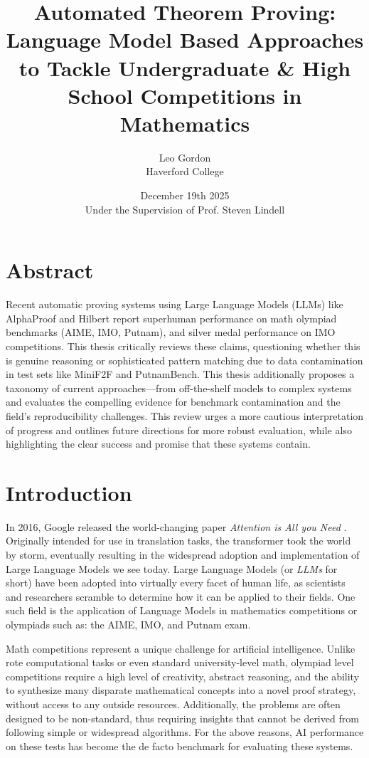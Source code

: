 \documentclass[12pt, letterpaper]{article}
\title{Automated Theorem Proving: Language Model Based Approaches to Tackle Undergraduate \& High School Competitions in Mathematics}
\author{Leo Gordon \\  Haverford College }
\date{December 19th 2025\\ Under the Supervision of Prof. Steven Lindell }
\begin{document}
\maketitle

\newpage
\tableofcontents

\newpage
\section{Abstract}
Recent automatic proving systems using Large Language Models (LLMs) like AlphaProof and Hilbert report superhuman performance on math olympiad benchmarks (AIME, IMO, Putnam), and silver medal performance on IMO competitions. This thesis critically reviews these claims, questioning whether this is genuine reasoning or sophisticated pattern matching due to data contamination in test sets like MiniF2F and PutnamBench. This thesis additionally proposes a taxonomy of current approaches—from off-the-shelf models to complex systems and evaluates the  compelling evidence for benchmark contamination and the field's reproducibility challenges. This review urges a more cautious interpretation of progress and outlines future directions for more robust evaluation, while also highlighting the clear success and promise that these systems contain.

\section{Introduction}

In 2016, Google released the world-changing paper \textit{Attention is All you Need} \citep{vaswani2023attentionneed}. Originally intended for use in translation tasks, the transformer took the world by storm, eventually resulting in the widespread adoption and implementation of Large Language Models we see today. Large Language Models (or \textit{LLMs} for short) have been adopted into virtually every facet of human life, as scientists and researchers scramble to determine how it can be applied to their fields. One such field is the application of Language Models in mathematics competitions or olympiads such as: the AIME, IMO, and Putnam exam.

Math competitions represent a unique challenge for artificial intelligence. Unlike rote computational tasks or even standard university-level math, olympiad level competitions require a high level of creativity, abstract reasoning, and the ability to synthesize many disparate mathematical concepts into a novel proof strategy, without access to any outside resources. Additionally, the problems are often designed to be non-standard, thus requiring insights that cannot be derived from following simple or widespread algorithms. For the above reasons, AI performance on these tests has become the de facto benchmark for evaluating these systems.
\end{document}
